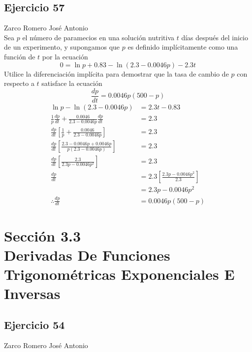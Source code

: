 \documentclass[12pt]{article}
\begin{document}
\subsection{Ejercicio 57} Zarco Romero José Antonio \\

Sea $p$ el número de paramecios en una solución nutritiva $t$ días después del inicio de un experimento, y supongamos que $p$ es definido implícitamente como una función de $t$ por la ecuación
\[
0 = \ln p + 0.83 − \ln(2.3-
0.0046p) − 2.3t
\]
Utilice la diferenciación implícita para demostrar que la tasa de cambio de $p$ con respecto a $t$ satisface la ecuación
\[
\frac{dp}{dt} = 0.0046p(500-p)
\]
\begin{equation*}
  \begin{split}
    \ln p - \ln(2.3 − 0.0046p)
    &= 2.3t -0.83 \\
    \frac{1}{p}\frac{dp}{dt}+\frac{0.0046}{2.3-0.0046p}\frac{dp}{dt}
    &= 2.3 \\
    \frac{dp}{dt}\left[\frac{1}{p}+\frac{0.0046}{2.3-0.0046p}\right]
    &= 2.3 \\
    \frac{dp}{dt}\left[\frac{2.3-0.0046p+ 0.0046p}{p(2.3-0.0046p)}\right]
    &= 2.3 \\
    \frac{dp}{dt}\left[\frac{2.3}{2.3p-0.0046p^2}\right]
    &= 2.3 \\
    \frac{dp}{dt}
    &= 2.3\left[\frac{2.3p-0.0046p^2}{2.3}\right] \\
    &= 2.3p-0.0046p^2 \\
    \therefore \frac{dp}{dt}
    &= 0.0046p(500-p)
  \end{split}
\end{equation*}

\section{Sección 3.3 \\ Derivadas De Funciones Trigonométricas Exponenciales E Inversas} 
\subsection{Ejercicio 54} Zarco Romero José Antonio \\
\end{document}
